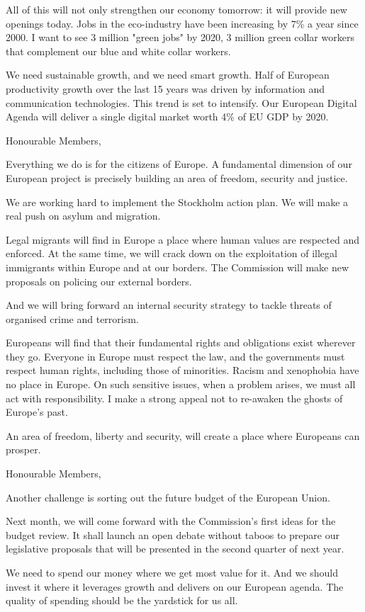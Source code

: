 \documentclass[a4paper,11pt]{article}
\begin{document}
All of this will not only strengthen our economy tomorrow: it will provide new openings today. Jobs in the eco-industry have been increasing by 7\% a year since 2000. I want to see 3 million "green jobs" by 2020, 3 million green collar workers that complement our blue and white collar workers.

We need sustainable growth, and we need smart growth. Half of European productivity growth over the last 15 years was driven by information and communication technologies. This trend is set to intensify. Our European Digital Agenda will deliver a single digital market worth 4\% of EU GDP by 2020.

Honourable Members,

Everything we do is for the citizens of Europe. A fundamental dimension of our European project is precisely building an area of freedom, security and justice.

We are working hard to implement the Stockholm action plan. We will make a real push on asylum and migration.

Legal migrants will find in Europe a place where human values are respected and enforced. At the same time, we will crack down on the exploitation of illegal immigrants within Europe and at our borders. The Commission will make new proposals on policing our external borders.

And we will bring forward an internal security strategy to tackle threats of organised crime and terrorism.

Europeans will find that their fundamental rights and obligations exist wherever they go. Everyone in Europe must respect the law, and the governments must respect human rights, including those of minorities. Racism and xenophobia have no place in Europe. On such sensitive issues, when a problem arises, we must all act with responsibility. I make a strong appeal not to re-awaken the ghosts of Europe's past.

An area of freedom, liberty and security, will create a place where Europeans can prosper.

Honourable Members,

Another challenge is sorting out the future budget of the European Union.

Next month, we will come forward with the Commission's first ideas for the budget review. It shall launch an open debate without taboos to prepare our legislative proposals that will be presented in the second quarter of next year.

We need to spend our money where we get most value for it. And we should invest it where it leverages growth and delivers on our European agenda. The quality of spending should be the yardstick for us all.
\end{document}
